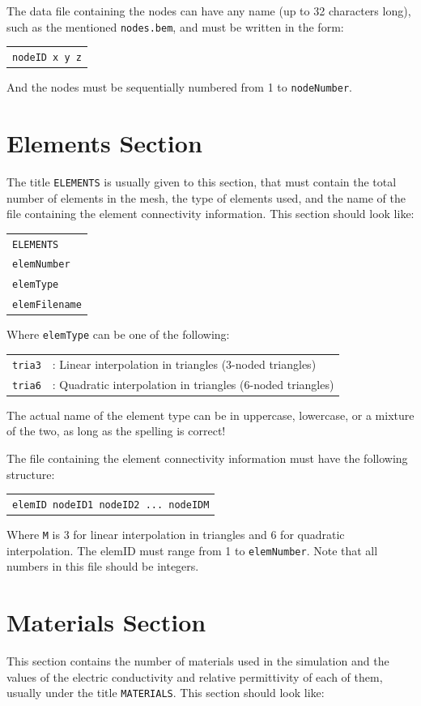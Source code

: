 \documentclass[12pt]{report}
\begin{document}
The data file containing the nodes can have any name (up to 32 characters long), such as the mentioned \verb+nodes.bem+, and must be written in the form:

\begin{tabular}{l}
\texttt{nodeID x y z}
\end{tabular}

And the nodes must be sequentially numbered from 1 to \verb+nodeNumber+.

\section{Elements Section}
The title \verb+ELEMENTS+ is usually given to this section, that must contain the total number of elements in the mesh, the type of elements used, and the name of the file containing the element connectivity information. This section should look like:

\begin{tabular}{l}
\texttt{ELEMENTS}\\
\texttt{elemNumber}\\
\texttt{elemType}\\
\texttt{elemFilename}
\end{tabular}

Where \verb+elemType+ can be one of the following:

\begin{tabular}{ll}
\texttt{tria3}&: Linear interpolation in triangles (3-noded triangles)\\
\texttt{tria6}&: Quadratic interpolation in triangles (6-noded triangles)
\end{tabular}

The actual name of the element type can be in uppercase, lowercase, or a mixture of the two, as long as the spelling is correct!

The file containing the element connectivity information must have the following structure:

\begin{tabular}{l}
\texttt{elemID nodeID1 nodeID2	... nodeIDM}
\end{tabular}

Where \verb+M+ is 3 for linear interpolation in triangles and 6 for quadratic interpolation. The elemID must range from 1 to \verb+elemNumber+. Note that all numbers in this file should be integers.

\section{Materials Section}
This section contains the number of materials used in the simulation and the values of the electric conductivity and relative permittivity of each of them, usually under the title \verb+MATERIALS+. This section should look like:
\end{document}
